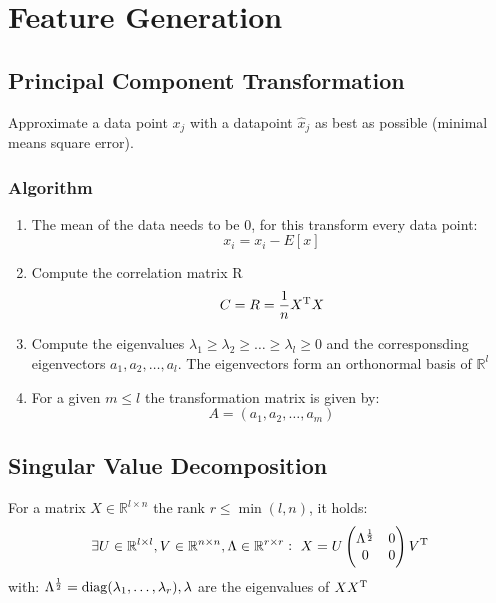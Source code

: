 \chapter{Feature Generation}
\section{Principal Component Transformation}
Approximate a data point $x_j$ with a datapoint $\hat{x}_j$ as best as possible (minimal means square error).
\subsection{Algorithm}
\begin{enumerate}
    \item The mean of the data needs to be $0$, for this transform every data point:
        \begin{equation*}
            x_i = x_i - E[x]
        \end{equation*}
    \item Compute the correlation matrix R
        \begin{equation*}
            C=R = \frac{1}{n} X^\text{T}X
        \end{equation*}
    \item Compute the eigenvalues $\lambda_1 \geq \lambda_2 \geq \ldots \geq \lambda_l \geq 0$ and the corresponsding eigenvectors $a_1, a_2, \ldots, a_l$. The eigenvectors form an orthonormal basis of $\mathbb{R}^l$
    \item For a given $m \leq l$ the transformation matrix is given by:
        \begin{equation*}
            A = (a_1, a_2, \ldots, a_m)
        \end{equation*}
\end{enumerate}

\section{Singular Value Decomposition}
For a matrix $X \in \mathbb{R}^{l \times n}$ the rank $r \leq \min(l, n)$, it holds:
\begin{equation*}
    \exists U \in \mathbb{R}^{l \times l}, V \in \mathbb{R}^{n \times n}, \Lambda \in \mathbb{R}^{r \times r}:\ 
        X = U \begin{pmatrix} \Lambda^{\frac{1}{2}} & 0 \\ 0 & 0 \end{pmatrix} \T{V}
\end{equation*}
with: $\Lambda^{\frac{1}{2}} = \operatorname*{diag}(\lambda_1, \ldots, \lambda_r), \lambda$ are the eigenvalues of $XX^\text{T}$

